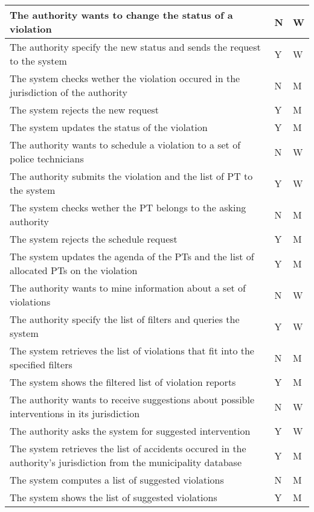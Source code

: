 \begin{longtable}{| p{} | p{} | p{} |}
      The authority wants to change the status of a violation & N & W\\
      \hline
      The authority specify the new status and sends the request to the system & Y & W\\
      \hline
      The system checks wether the violation occured in the jurisdiction of the authority & N & M\\
      \hline
      The system rejects the new request & Y & M\\
      \hline
      The system updates the status of the violation & Y & M\\
      \hline
      
      The authority wants to schedule a violation to a set of police technicians & N & W\\
      \hline
      The authority submits the violation and the list of PT to the system & Y & W\\
      \hline
      The system checks wether the PT belongs to the asking authority& N & M\\
      \hline
      The system rejects the schedule request & Y & M\\
      \hline
      The system updates the agenda of the PTs and the list of allocated PTs on the violation & Y & M\\
      \hline

      The authority wants to mine information about a set of violations & N & W\\
      \hline
      The authority specify the list of filters and queries the system & Y & W\\
      \hline
      The system retrieves the list of violations that fit into the specified filters & N & M\\
      \hline
      The system shows the filtered list of violation reports & Y & M\\
      \hline

      The authority wants to receive suggestions about possible interventions in its jurisdiction & N & W\\
      \hline
      The authority asks the system for suggested intervention & Y & W\\
      \hline
      The system retrieves the list of accidents occured in the authority's jurisdiction from the municipality database & Y & M\\
      \hline
      The system computes a list of suggested violations & N & M\\
      \hline
      The system shows the list of suggested violations & Y & M\\
      \hline
  \end{longtable}